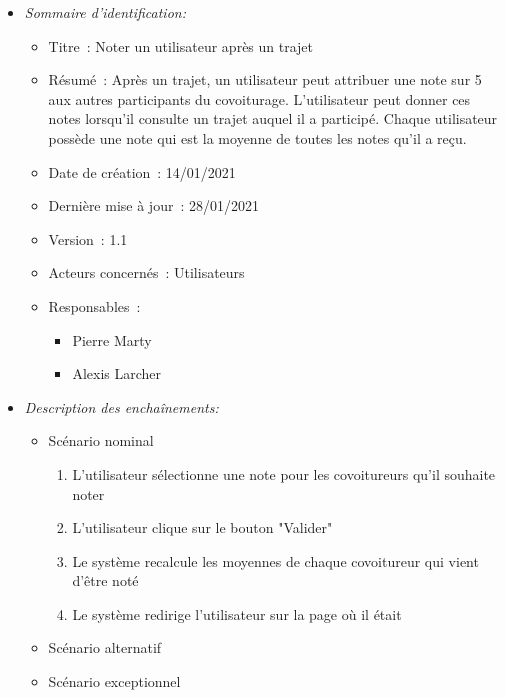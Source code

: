 \begin{itemize}

\item \textit{Sommaire d'identification:}

\begin{itemize}

\item Titre~: Noter un utilisateur après un trajet

\item Résumé~: Après un trajet, un utilisateur peut attribuer une note sur 5 aux autres participants
du covoiturage. L'utilisateur peut donner ces notes lorsqu'il consulte un trajet auquel il a participé.
Chaque utilisateur possède une note qui est la moyenne de toutes les notes qu'il a reçu.

\item Date de création~: 14/01/2021

\item Dernière mise à jour~: 28/01/2021

\item Version~: 1.1

\item Acteurs concernés~: Utilisateurs

\item Responsables~:
\begin{itemize}
            \item Pierre Marty
            \item Alexis Larcher
        \end{itemize}

\end{itemize}

\item \textit{Description des enchaînements:}

\begin{itemize}
    \item Scénario nominal
    \begin{enumerate}
        \item L'utilisateur sélectionne une note pour les covoitureurs qu'il souhaite noter
        \item L'utilisateur clique sur le bouton "Valider"
        \item Le système recalcule les moyennes de chaque covoitureur qui vient d'être noté
        \item Le système redirige l'utilisateur sur la page où il était
    \end{enumerate}
    \item Scénario alternatif
    \item Scénario exceptionnel
\end{itemize}


\end{itemize}
